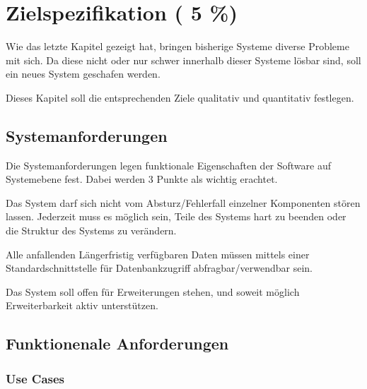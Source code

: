 \chapter{Zielspezifikation ( 5 \%)}

Wie das letzte Kapitel gezeigt hat,
bringen bisherige Systeme diverse Probleme mit sich.
Da diese nicht oder nur schwer innerhalb dieser Systeme l\"osbar sind,
soll ein neues System geschafen werden.

Dieses Kapitel soll die entsprechenden Ziele qualitativ und quantitativ festlegen.







\section{Systemanforderungen}

Die Systemanforderungen legen funktionale Eigenschaften der Software auf Systemebene fest.
Dabei werden 3 Punkte als wichtig erachtet.


\begin{description}

\dhitem[S1]
Das System darf sich nicht vom Absturz/Fehlerfall einzelner Komponenten st\"oren lassen.
Jederzeit muss es m\"oglich sein, Teile des Systems hart zu beenden oder
die Struktur des Systems zu ver\"andern.

\dhitem[S2]
Alle anfallenden L\"angerfristig verf\"ugbaren Daten m\"ussen mittels einer Standardschnittstelle
f\"ur Datenbankzugriff abfragbar/verwendbar sein.

\dhitem[S3]
Das System soll offen f\"ur Erweiterungen stehen,
und soweit m\"oglich Erweiterbarkeit aktiv unterst\"utzen.
\end{description}


\section{Funktionenale Anforderungen}
\subsection{Use Cases}

